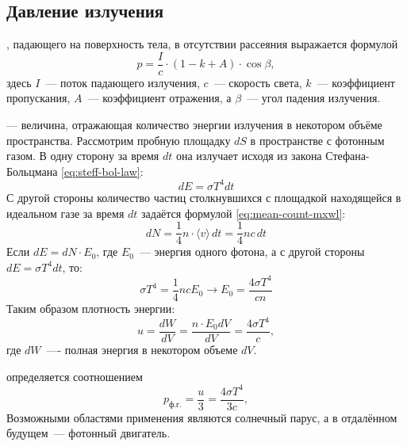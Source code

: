 \subsection{Давление излучения}
, падающего на поверхность тела, в отсутствии рассеяния выражается формулой
\begin{equation}
    p = \frac{I}{c} \cdot (1 - k + A) \cdot \cos \beta,
\end{equation}
здесь $I$~--- поток падающего излучения, $c$~--- скорость света, $k$~--- коэффициент пропускания, $A$~--- коэффициент отражения, а $\beta$~--- угол падения излучения.

 — величина, отражающая количество энергии излучения в некотором объёме пространства. Рассмотрим пробную  площадку $dS$ в пространстве с фотонным газом. В одну сторону за время $dt$ она излучает исходя из закона Стефана-Больцмана \eqref{eq:steff-bol-law}:
\begin{equation*}
	d E=\sigma T^4 d t
\end{equation*}
С другой стороны количество частиц столкнувшихся с площадкой находящейся в идеальном газе за время $dt$ задаётся формулой \eqref{eq:mean-count-mxwl}:
\begin{equation*}
d N=\frac{1}{4} n \cdot\langle v\rangle \, d t=\frac{1}{4} n c \, d t
\end{equation*}
Если $d E=d N \cdot E_0$, где $E_0$~--- энергия одного фотона, а с другой стороны $d E=\sigma T^4 d t$, то:
\begin{equation*}
\sigma T^4=\frac{1}{4} n c E_0 \rightarrow E_0=\frac{4 \sigma T^4}{c n}
\end{equation*}
Таким образом плотность энергии:
\begin{equation}
	u=\frac{d W}{d V}=\frac{n \cdot E_0 d V}{d V}=\frac{4 \sigma T^4}{c},
\end{equation}
где $dW$~---- полная энергия в некотором объеме $dV$.

 определяется соотношением
\begin{equation}
    p_\text{ф.г.} = \frac{u}{3} = \frac{4 \sigma T^4}{3c},
\end{equation}
Возможными областями применения являются солнечный парус, а в отдалённом будущем~--- фотонный двигатель.
